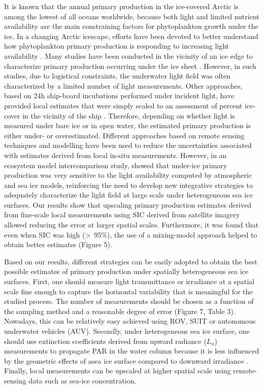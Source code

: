 \documentclass[draft]{agujournal2018}
\newcommand{\lu}{\ensuremath{{L_u}}}
\begin{document}
It is known that the annual primary production in the ice-covered Arctic is among the lowest of all oceans worldwide, because both light and limited nutrient availability are the main constraining  factors for phytoplankton growth under the ice. In a changing Arctic icescape, efforts have been devoted to better understand how phytoplankton primary production is responding to increasing light availability \citep{Fernandez-Mendez2015, Vancoppenolle2013}. Many studies have been conducted in the vicinity of an ice edge to characterize primary production occurring under the ice sheet \citep{Arrigo2012, Arrigo2014, Mundy2009}. However, in such studies, due to logistical constraints, the underwater light field was often characterized by a limited number of light measurements. Other approaches, based on 24h ship-board incubations performed under incident light, have provided local estimates that were simply scaled to an assessment of percent ice-cover in the vicinity of the ship \citep{Smith1995, Gosselin1997, Mei2003}. Therefore, depending on whether light is measured under bare ice or in open water, the estimated primary production is either under- or overestimated. Different approaches based on remote sensing techniques and modelling have been used to reduce the uncertainties associated with estimates derived from local in-situ measurements. However, in an ecosystem model intercomparison study, \citet{Jin2015} showed that under-ice primary production was very sensitive to the light availability computed by atmospheric and sea ice models, reinforcing the need to develop new integrative strategies to adequately characterize the light field at large scale under heterogeneous sea ice surfaces. Our results show that upscaling primary production estimates derived from fine-scale local measurements using SIC derived from satellite imagery allowed reducing the error at larger spatial scales. Furthermore, it was found that even when SIC was high (\textgreater~95\%), the use of a mixing-model approach helped to obtain better estimates (Figure 5).

Based on our results, different strategies can be easily adopted to obtain the best possible estimates of primary production under spatially heterogeneous sea ice surfaces. First, one should measure light transmittance or irradiance at a spatial scale fine enough to capture the horizontal variability that is meaningful for the studied process. The number of measurements should be chosen as a function of the sampling method and a reasonable degree of error (Figure 7, Table 3). Nowadays, this can be relatively easy achieved using ROV, SUIT or autonomous underwater vehicles (AUV). Secondly, under heterogeneous sea ice surface, one should use extinction coefficients derived from upward radiance (\lu{}) measurements to propagate PAR in the water column because it is less influenced by the geometric effects of asea ice surface compared to downward irradiance \citep{Katlein2016, Massicotte2018}. Finally, local measurements can be upscaled at higher spatial scale using remote-sensing data such as sea-ice concentration.
\end{document}
